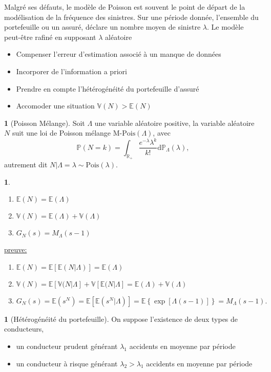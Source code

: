 \documentclass[8pt,notheorems]{beamer}
\def \E{\mathbb E}
\def \P {\mathbb P}
\def \V{\mathbb V}
\newcommand{\R}{\mathbb{R}}
\newtheorem{prop}{\translate{Proposition}}
\theoremstyle{definition}
\newtheorem{definition}{\translate{Definition}}
\theoremstyle{example}
\newtheorem{example}{\translate{Example}}
\theoremstyle{mystyle}
\theoremstyle{plain}
\begin{document}
\begin{frame}[allowframebreaks]
Malgré ses défauts, le modèle de Poisson est souvent le point de départ de la modélisation de la fréquence des sinistres. Sur une période donnée, l'ensemble du portefeuille ou un assuré, déclare un nombre moyen de sinistre $\lambda$. Le modèle peut-être rafiné en supposant $\lambda$ aléatoire
\begin{itemize}
 \item Compenser l'erreur d'estimation associé à un manque de données
 \item Incorporer de l'information a priori
 \item Prendre en compte l'hétérogénéité du portefeuille d'assuré
 \item Accomoder une situation $\V(N)>\E(N)$
 \end{itemize}
 \begin{definition}[Poisson Mélange]
  Soit $\Lambda$ une variable aléatoire positive, la variable aléatoire $N$ suit une loi de Poisson mélange $\text{M-Pois}(\Lambda)$, avec
  $$
  \P(N = k) = \int_{\R_+}\frac{e^{-\lambda}\lambda^k}{k!}\text{d}\P_{\Lambda}(\lambda),
  $$
  autrement dit $N|\Lambda=\lambda \sim\text{Pois}(\lambda)$.
 \end{definition}
 \begin{prop}
 \begin{enumerate}
 \item $\E(N) =\E(\Lambda)$
 \item $\V(N) = \E(\Lambda)+\V(\Lambda)$
 \item $G_N(s)=M_\Lambda(s-1)$
 \end{enumerate}
 \end{prop}
 \underline{preuve:}
 \begin{enumerate}
 \item $\E(N)=\E[\E(N|\Lambda)]=\E(\Lambda)$
 \item $\V(N)=\E[\V(N|\Lambda]+ \V[\E(N|\Lambda]=\E(\Lambda)+ \V(\Lambda)$
 \item $G_N(s)=\E\left(s^N\right)=\E\left[\E\left(s^N|\Lambda\right)\right]=\E\left\{\exp[\Lambda(s-1)]\right\}=M_\Lambda(s-1).$
 \end{enumerate}
 \begin{example}[Hétérogénéité du portefeuille]
 On suppose l'existence de deux types de conducteurs,
 \begin{itemize}
 \item un conducteur prudent générant $\lambda_1$ accidents en moyenne par période
 \item un conducteur à risque générant $\lambda_2>\lambda_1$ accidents en moyenne par période

\end{itemize}
\end{example}
\end{frame}
\end{document}
